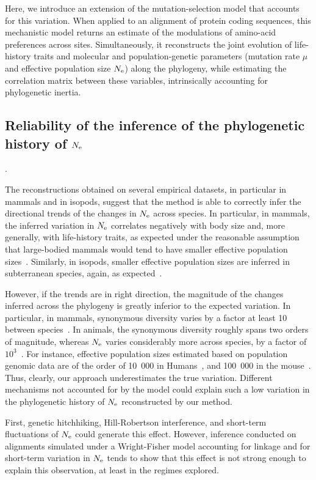 Here, we introduce an extension of the mutation-selection model that accounts for this variation.
When applied to an alignment of protein coding sequences, this mechanistic model returns an estimate of the modulations of amino-acid preferences across sites.
Simultaneously, it reconstructs the joint evolution of life-history traits and molecular and population-genetic parameters (mutation rate $\mu$ and effective population size $N_{\text{e}}$) along the phylogeny, while estimating the correlation matrix between these variables, intrinsically accounting for phylogenetic inertia.

\subsection{Reliability of the inference of the phylogenetic history of \texorpdfstring{$N_{\text{e}}$}{Nₑ}}.

The reconstructions obtained on several empirical datasets, in particular in mammals and in isopods, suggest that the method is able to correctly infer the directional trends of the changes in $N_{\text{e}}$ across species.
In particular, in mammals, the inferred variation in $N_{\text{e}}$ correlates negatively with body size and, more generally, with life-history traits, as expected under the reasonable assumption that large-bodied mammals would tend to have smaller effective population sizes~\cite{Popadin2007,Lartillot2012,Nabholz2013,Figuet2017}.
Similarly, in isopods, smaller effective population sizes are inferred in subterranean species, again, as expected~\citep{Capderrey2013}.

However, if the trends are in right direction, the magnitude of the changes inferred across the phylogeny is greatly inferior to the expected variation.
In particular, in mammals, synonymous diversity varies by a factor at least 10 between species~\citep{Galtier2016}.
In animals, the synonymous diversity roughly spans two orders of magnitude, whereas $N_{\text{e}}$ varies considerably more across species, by a factor of $10^3$~\citep{Galtier2019}.
For instance, effective population sizes estimated based on population genomic data are of the order of 10~000 in Humans~\citep{Li2011}, and 100~000 in the mouse~\citep{Geraldes2008}.
Thus, clearly, our approach underestimates the true variation.
Different mechanisms not accounted for by the model could explain such a low variation in the phylogenetic history of $N_{\text{e}}$ reconstructed by our method.

First, genetic hitchhiking, Hill-Robertson interference, and short-term fluctuations of $N_{\text{e}}$ could generate this effect.
However, inference conducted on alignments simulated under a Wright-Fisher model accounting for linkage and for short-term variation in $N_{\text{e}}$ tends to show that this effect is not strong enough to explain this observation, at least in the regimes explored.

